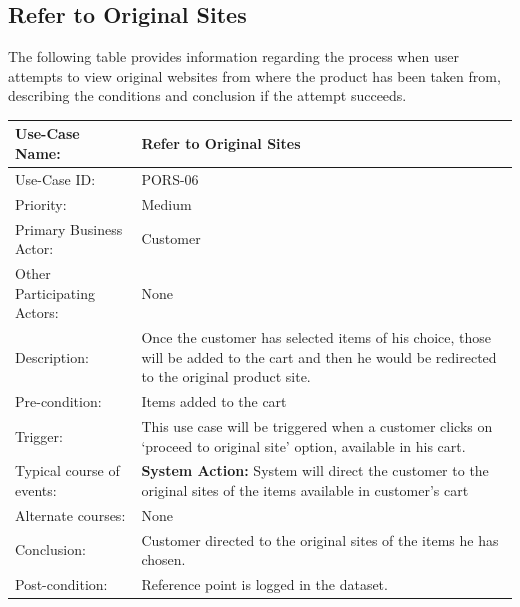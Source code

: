 \subsection{Refer to Original Sites}
The following table provides information regarding the process when user attempts to view original websites from where the product has been taken from, describing the conditions and conclusion if the attempt succeeds. 
\begin{center}
    \begin{tabular}{ @{}|p{5cm}||p{7cm}|  }
    \hline
    Use-Case Name: & Refer to Original Sites  \\ \hline
    Use-Case ID: & PORS-06 \\ \hline
    Priority: & Medium \\ \hline
    Primary Business Actor: & Customer \\ \hline
    Other Participating Actors: & None \\ \hline
    Description: & Once the customer has selected items of his choice, those will be added to the cart and then he would be redirected to the original product site.
 \\ \hline
    Pre-condition: & Items added to the cart \\ \hline
    Trigger: & This use case will be triggered when a customer clicks on ‘proceed to original site’ option, available in his cart. \\ \hline
    Typical course of events: & \textbf{System Action:} \newline System will direct the customer to the original sites of the items available in customer’s cart
 \\ \hline
    Alternate courses: & None\\ \hline
    Conclusion: &  Customer directed to the original sites of the items he has chosen.\\ \hline
    Post-condition: &  Reference point is logged in the dataset. \\ \hline
    \end{tabular}
\end{center}

